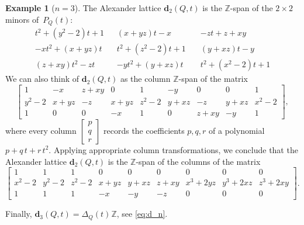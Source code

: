 \documentclass[11pt, letterpaper]{amsart}
\theoremstyle{definition}
\newtheorem{example}[theorem]{Example}
\numberwithin{equation}{section}
\def\ZZ{{\mathbb Z}}
\def\dd{{\mathbf{d}}}
\begin{document}
\begin{example}[$n=3$]
The Alexander lattice $\dd_2(Q,t)$ is the $\ZZ$-span of the $2\times 2$ minors of~$P_Q(t)$: 
\begin{equation*}
\begin{matrix}
t^2+(y^2-2)t+1 & (x+yz)t-x & -zt + z+xy \\[4pt]
-xt^2+(x+yz)t  \quad & t^2 + (z^2-2)t +1 \quad & (y+xz)t-y \\[4pt]
(z+xy)t^2-zt   & -yt^2 +(y+xz)t & t^2 +(x^2-2)t +1
\end{matrix}
\end{equation*}
We can also think of $\dd_2(Q,t)$ as the column $\ZZ$-span of the matrix 
\begin{equation*}
\begin{bmatrix}
1		& -x		& z+xy	& 0		& 1		& -y		& 0		& 0		& 1 \\
y^2-2	& x+yz	& -z		& x+yz	& z^2-2	& y+xz	& -z		& y+xz	& x^2-2 \\
1		& 0		& 0		& -x		& 1		& 0 		& z+xy	& -y		& 1
\end{bmatrix} \!,
\end{equation*}
where every column $\left[ \begin{smallmatrix} p\\ q\\ r\end{smallmatrix}\right]$ 
records the coefficients $p,q,r$ of a polynomial $p+q\,t+r\,t^2$. 
Applying appropriate column transformations, we conclude that the Alexander lattice $\dd_2(Q,t)$
is the $\ZZ$-span of the columns of the matrix
\begin{equation}
\label{eq:d2-3vert}
\begin{bmatrix}
1		& 1		& 1		& 0		& 0		& 0		& 0		& 0		& 0 \\
x^2\!-\!2	& y^2\!-\!2	& z^2\!-\!2	& x\!+\!yz	& y\!+\!xz	& z\!+\!xy	& x^3\!+\!2yz	& y^3\!+\!2xz	& z^3\!+\!2xy \\
1		& 1		& 1		& -x		& -y		& -z 		& 0		& 0		& 0
\end{bmatrix} \!\!.
\end{equation}

Finally, $\dd_3(Q,t)=\Delta_Q(t)\hspace{1pt}\ZZ $, see \eqref{eq:d_n}. 
\end{example}
\end{document}
